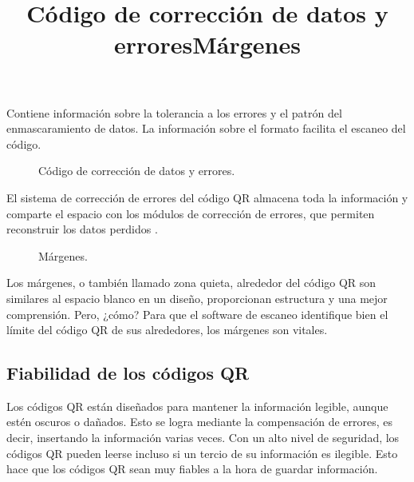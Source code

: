 Contiene información sobre la tolerancia a los errores y el patrón del enmascaramiento de datos. La información sobre el formato facilita el escaneo del código. \cite{CitaA01}\\

\newpage
\title{Código de corrección de datos y errores}

\begin{figure}[htbp]
	\begin{center}
		\caption{Código de corrección de datos y errores.}
		\label{fig:erroresDatos}
	\end{center}
\end{figure}

El sistema de corrección de errores del código QR almacena toda la información y comparte el espacio con los módulos de corrección de errores, que permiten reconstruir los datos perdidos\cite{CitaA01} . \\

\title{Márgenes}

\begin{figure}[htbp]
	\begin{center}
		\caption{Márgenes.}
		\label{fig:margenes}
	\end{center}
\end{figure}

Los márgenes, o también llamado zona quieta, alrededor del código QR son similares al espacio blanco en un diseño, proporcionan estructura y una mejor comprensión. Pero, ¿cómo? Para que el software de escaneo identifique bien el límite del código QR de sus alrededores, los márgenes son vitales.

\subsection{Fiabilidad de los códigos QR}
Los códigos QR están diseñados para mantener la información legible, aunque estén oscuros o dañados. Esto se logra mediante la compensación de errores, es decir, insertando la información varias veces. Con un alto nivel de seguridad, los códigos QR pueden leerse incluso si un tercio de su información es ilegible. Esto hace que los códigos QR sean muy fiables a la hora de guardar información. \\

